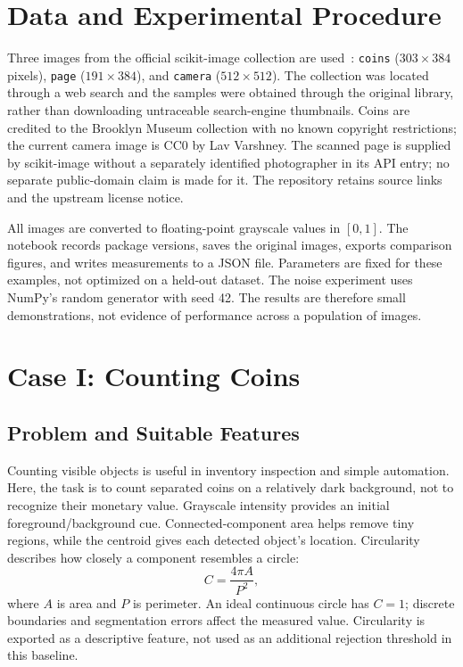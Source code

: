 \documentclass[conference]{IEEEtran}
\begin{document}
\section{Data and Experimental Procedure}
Three images from the official scikit-image collection are used~\cite{samples}: \texttt{coins} ($303\times384$ pixels), \texttt{page} ($191\times384$), and \texttt{camera} ($512\times512$). The collection was located through a web search and the samples were obtained through the original library, rather than downloading untraceable search-engine thumbnails. Coins are credited to the Brooklyn Museum collection with no known copyright restrictions; the current camera image is CC0 by Lav Varshney. The scanned page is supplied by scikit-image without a separately identified photographer in its API entry; no separate public-domain claim is made for it. The repository retains source links and the upstream license notice.

All images are converted to floating-point grayscale values in $[0,1]$. The notebook records package versions, saves the original images, exports comparison figures, and writes measurements to a JSON file. Parameters are fixed for these examples, not optimized on a held-out dataset. The noise experiment uses NumPy's random generator with seed 42. The results are therefore small demonstrations, not evidence of performance across a population of images.

\section{Case I: Counting Coins}
\subsection{Problem and Suitable Features}
Counting visible objects is useful in inventory inspection and simple automation. Here, the task is to count separated coins on a relatively dark background, not to recognize their monetary value. Grayscale intensity provides an initial foreground/background cue. Connected-component area helps remove tiny regions, while the centroid gives each detected object's location. Circularity describes how closely a component resembles a circle:
\begin{equation}
C=\frac{4\pi A}{P^2},
\end{equation}
where $A$ is area and $P$ is perimeter. An ideal continuous circle has $C=1$; discrete boundaries and segmentation errors affect the measured value. Circularity is exported as a descriptive feature, not used as an additional rejection threshold in this baseline.
\end{document}
